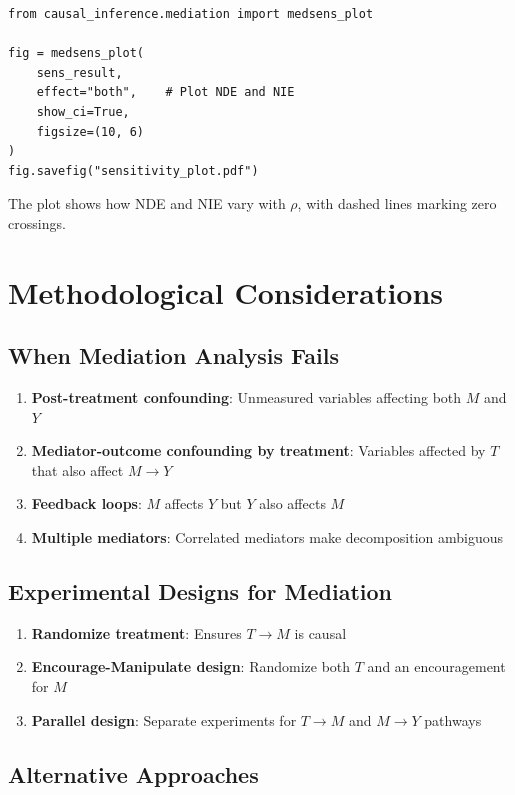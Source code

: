 \begin{verbatim}
from causal_inference.mediation import medsens_plot

fig = medsens_plot(
    sens_result,
    effect="both",    # Plot NDE and NIE
    show_ci=True,
    figsize=(10, 6)
)
fig.savefig("sensitivity_plot.pdf")
\end{verbatim}

The plot shows how NDE and NIE vary with $\rho$, with dashed lines marking zero crossings.


\section{Methodological Considerations}

\subsection{When Mediation Analysis Fails}

\begin{enumerate}
\item \textbf{Post-treatment confounding}: Unmeasured variables affecting both $M$ and $Y$
\item \textbf{Mediator-outcome confounding by treatment}: Variables affected by $T$ that also affect $M \to Y$
\item \textbf{Feedback loops}: $M$ affects $Y$ but $Y$ also affects $M$
\item \textbf{Multiple mediators}: Correlated mediators make decomposition ambiguous
\end{enumerate}

\subsection{Experimental Designs for Mediation}

\begin{enumerate}
\item \textbf{Randomize treatment}: Ensures $T \to M$ is causal
\item \textbf{Encourage-Manipulate design}: Randomize both $T$ and an encouragement for $M$
\item \textbf{Parallel design}: Separate experiments for $T \to M$ and $M \to Y$ pathways
\end{enumerate}

\subsection{Alternative Approaches}

